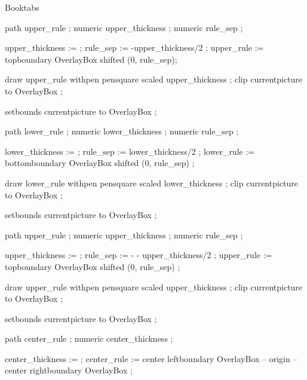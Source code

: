 \startenvironment Booktabs


path upper_rule ;
numeric upper_thickness ;
numeric rule_sep ;

upper_thickness :=  ; %
rule_sep := -upper_thickness/2 ;
upper_rule := topboundary OverlayBox shifted (0, rule_sep); %

draw upper_rule withpen pensquare scaled upper_thickness ; %
clip currentpicture to OverlayBox ; %

setbounds currentpicture to OverlayBox ; %

\stopuseMPgraphic


path lower_rule ;
numeric lower_thickness ;
numeric rule_sep ;

lower_thickness :=  ;
rule_sep := lower_thickness/2 ;
lower_rule := bottomboundary OverlayBox shifted (0, rule_sep) ;

draw lower_rule withpen pensquare scaled lower_thickness ;
clip currentpicture to OverlayBox ;

setbounds currentpicture to OverlayBox ;

\stopuseMPgraphic


path upper_rule ;
numeric upper_thickness ;
numeric rule_sep ;

upper_thickness :=  ;
rule_sep := - - upper_thickness/2 ;
upper_rule := topboundary OverlayBox shifted (0, rule_sep) ;

draw upper_rule withpen pensquare scaled upper_thickness ;
clip currentpicture to OverlayBox ;

setbounds currentpicture to OverlayBox ;

\stopuseMPgraphic


path center_rule ;
numeric center_thickness ;

center_thickness :=  ;
center_rule := center leftboundary OverlayBox -- origin -- center rightboundary OverlayBox ;

